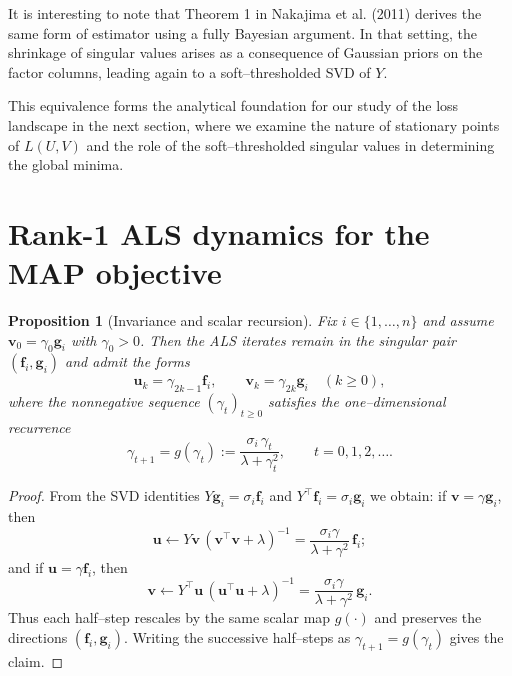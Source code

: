 \documentclass[11pt]{article}
\theoremstyle{spaced}
\newtheorem{proposition}{Proposition}
\begin{document}
It is interesting to note that Theorem 1 in Nakajima et al. (2011) derives the same form of estimator using a fully Bayesian argument.
In that setting, the shrinkage of singular values arises as a consequence of Gaussian priors on the factor columns, leading again to a soft--thresholded SVD of \(Y\).

This equivalence forms the analytical foundation for our study of the loss landscape in the next section, where we examine the nature of stationary points of \(L(U,V)\) and the role of the soft--thresholded singular values in determining the global minima.


\section{Rank-1 ALS dynamics for the MAP objective}

\begin{proposition}[Invariance and scalar recursion]
\label{prop:als_rank1_invariance}
Fix $i \in \{1,\dots,n\}$ and assume $\mathbf{v}_0 = \gamma_0 \mathbf{g}_i$ with $\gamma_0>0$. 
Then the ALS iterates remain in the singular pair $(\mathbf{f}_i,\mathbf{g}_i)$ and admit the forms
\[
\mathbf{u}_k = \gamma_{2k-1} \mathbf{f}_i, \qquad \mathbf{v}_k = \gamma_{2k} \mathbf{g}_i \quad (k\ge 0),
\]
where the nonnegative sequence $(\gamma_t)_{t\ge0}$ satisfies the one--dimensional recurrence
\[
\boxed{\ \gamma_{t+1} = g(\gamma_t)
:= \frac{\sigma_i\,\gamma_t}{\lambda + \gamma_t^2},\qquad t=0,1,2,\dots. \ }
\]
\end{proposition}

\begin{proof}
From the SVD identities $Y \mathbf{g}_i = \sigma_i \mathbf{f}_i$ and $Y^\top \mathbf{f}_i = \sigma_i \mathbf{g}_i$ we obtain:
if $\mathbf{v} = \gamma \mathbf{g}_i$, then
\[
\mathbf{u} \leftarrow Y\mathbf{v}\,(\mathbf{v}^\top \mathbf{v}+\lambda)^{-1}
   = \frac{\sigma_i\gamma}{\lambda+\gamma^2}\,\mathbf{f}_i;
\]
and if $\mathbf{u} = \gamma \mathbf{f}_i$, then
\[
\mathbf{v} \leftarrow Y^\top \mathbf{u}\,(\mathbf{u}^\top \mathbf{u}+\lambda)^{-1}
   = \frac{\sigma_i\gamma}{\lambda+\gamma^2}\,\mathbf{g}_i.
\]
Thus each half--step rescales by the same scalar map $g(\cdot)$ and preserves the directions
$(\mathbf{f}_i,\mathbf{g}_i)$.
Writing the successive half--steps as $\gamma_{t+1}=g(\gamma_t)$ gives the claim.
\end{proof}
\end{document}
